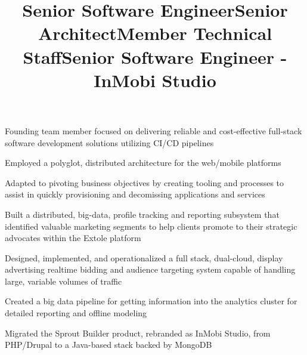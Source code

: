 \documentclass[margin,line]{resume}
\newenvironment{bullet-list}{
  \begin{list}{$\bullet$}{%
      \setlength{\itemsep}{0in}
      \setlength{\parsep}{0in} \setlength{\parskip}{0in}
      \setlength{\topsep}{0in} \setlength{\partopsep}{0in}
      \setlength{\leftmargin}{0.2in}}}{\end{list}}
\begin{document}
\begin{resume}
\title{Senior Software Engineer}
\begin{position}
\vspace{-.3cm}
\begin{bullet-list}
\item Founding team member focused on delivering reliable and
cost-effective full-stack software development solutions utilizing CI/CD pipelines
\item Employed a polyglot, distributed architecture for the web/mobile platforms
\item Adapted to pivoting business objectives by creating tooling and processes
to assist in quickly provisioning and decomissing applications and services
\end{bullet-list}
\end{position}

\title{Senior Architect}
\begin{position}
\vspace{-.3cm}
\begin{bullet-list}
\item Built a distributed, big-data, profile tracking and reporting subsystem
that identified valuable marketing segments to help clients promote to
their strategic advocates within the Extole platform
\end{bullet-list}
\end{position}

\title{Member Technical Staff}
\begin{position}
\vspace{-.3cm}
\begin{bullet-list}
\item Designed, implemented, and operationalized a full
stack, dual-cloud, display advertising realtime bidding and audience
targeting system capable of handling large, variable volumes of traffic
\item Created a big data pipeline for getting information
into the analytics cluster for detailed reporting and offline modeling
\end{bullet-list}
\end{position}

\title{Senior Software Engineer - InMobi Studio}
\begin{position}
\vspace{-.3cm}
\begin{bullet-list}
\item Migrated the Sprout Builder product, rebranded as InMobi Studio,
from PHP/Drupal to a Java-based stack backed by MongoDB
\end{bullet-list}
\end{position}


\end{resume}
\end{document}
